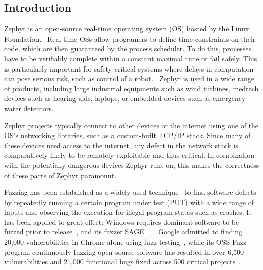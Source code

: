 \documentclass{article}
\let\savedCite=\cite
\renewcommand{\cite}{\unskip~\savedCite}
\begin{document}
\begin{multicols}{2}
  \tableofcontents


  \section{Introduction}
  \label{Introduction}

  Zephyr is an open-source real-time operating system (OS) hosted by the Linux Foundation.\cite{ZephyrAbout} Real-time OSs allow programers to define time constraints on their code, which are then guaranteed by the process scheduler. To do this, processes have to be verifiably complete within a constant maximal time or fail safely. This is particularly important for safety-critical systems where delays in computation can pose serious risk, such as control of a robot.\cite{RTOSWiki} Zephyr is used in a wide range of products, including large industrial equipments such as wind turbines, medtech devices such as hearing aids, laptops, or embedded devices such as emergency water detectors.\cite{ZephyrUsedIn}

  Zephyr projects typically connect to other devices or the internet using one of the OS's networking libraries, such as a custom-built TCP/IP stack. Since many of these devices need access to the internet, any defect in the network stack is comparatively likely to be remotely exploitable and thus critical. In combination with the potentially dangerous devices Zephyr runs on, this makes the correctness of these parts of Zephyr paramount.

  Fuzzing has been established as a widely used technique\cite{Demystifying} to find software defects by repeatedly running a certain program under test (PUT) with a wide range of inputs and observing the execution for illegal program states such as crashes. It has been applied to great effect: Windows requires dominant software to be fuzzed prior to release\cite{Demystifying}, and its fuzzer SAGE\cite{SAGE} \cite{FuzzingTheStateOfTheArt}. Google admitted to finding 20,000 vulnerabilities in Chrome alone using fuzz testing\cite{Demystifying}, while its OSS-Fuzz program continuously fuzzing open-source software has resulted in over 6,500 vulnerabilities and 21,000 functional bugs fixed across 500 critical projects\cite{ClusterFuzzLite}.


\end{multicols}
\end{document}
